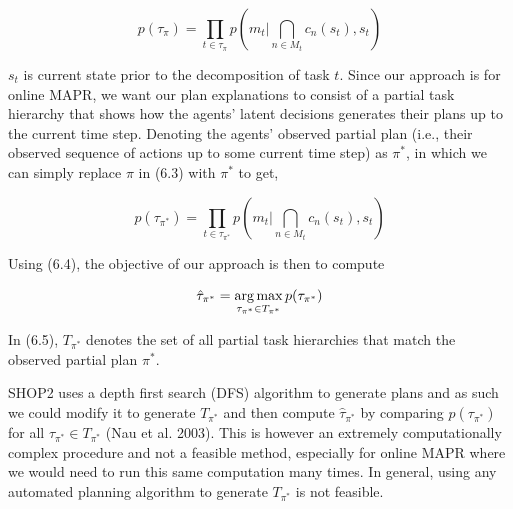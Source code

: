 \begin{equation}
p(\tau_\pi) = \prod_{t \in \tau_\pi} p(m_t | \bigcap_{n \in M_t} c_n(s_t), s_t) 
\end{equation}

$s_t$ is current state prior to the decomposition of task $t$. Since our approach is for online MAPR, we want our plan explanations to consist of a partial task hierarchy that shows how the agents' latent decisions generates their plans up to the current time step. Denoting the agents' observed partial plan (i.e., their observed sequence of actions up to some current time step) as $\pi^*$, in which we can simply replace $\pi$ in (6.3) with $\pi^*$ to get,

\begin{equation}
p(\tau_{\pi^*}) = \prod_{t \in \tau_{\pi^*}} p(m_t | \bigcap_{n \in M_t} c_n(s_t), s_t) 
\end{equation}

Using (6.4), the objective of our approach is then to compute 

\begin{equation}
\hat{\tau}_{\pi^*} = \operatorname*{arg\,max}_{\tau_{\pi^*} \in T_{\pi^*}} p(\tau_{\pi^*})
\end{equation}

In (6.5), $T_{\pi^*}$ denotes the set of all partial task hierarchies that match the observed partial plan $\pi^*$.

SHOP2 uses a depth first search (DFS) algorithm to generate plans and as such we could modify it to generate $T_{\pi^*}$ and then compute $\hat{\tau}_{\pi^*}$ by comparing $p(\tau_{\pi^*})$ for all $\tau_{\pi^*} \in T_{\pi^*}$ (Nau et al. 2003). This is however an extremely computationally complex procedure and not a feasible method, especially for online MAPR where we would need to run this same computation many times. In general, using any automated planning algorithm to generate $T_{\pi^*}$ is not feasible. 

